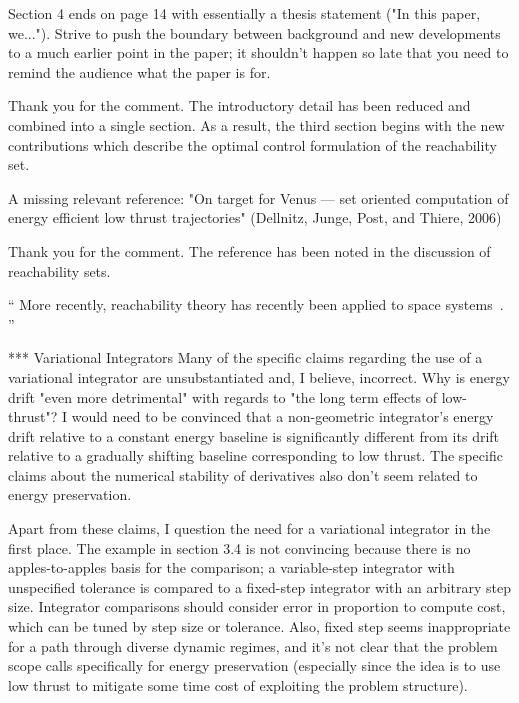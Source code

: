 \documentclass[11pt]{article}
\newenvironment{correction}{\begin{list}{}{\setlength{\leftmargin}{1cm}\setlength{\rightmargin}{1cm}}\vspace{\parsep}\item[]``}{''\end{list}}
\begin{document}
\begin{enumerate}
\item
    \begin{itshape}
Section 4 ends on page 14 with essentially a thesis statement ("In this paper, we...").  Strive to push the boundary between background and new developments to a much earlier point in the paper; it shouldn't happen so late that you need to remind the audience what the paper is for.
\end{itshape}

Thank you for the comment. 
The introductory detail has been reduced and combined into a single section. 
As a result, the third section begins with the new contributions which describe the optimal control formulation of the reachability set.

\item 
    \begin{itshape}
A missing relevant reference: "On target for Venus — set oriented computation of energy efficient low thrust trajectories" (Dellnitz, Junge, Post, and Thiere, 2006)
\end{itshape}

Thank you for the comment.
The reference has been noted in the discussion of reachability sets.
\begin{correction}
More recently, reachability theory has recently been applied to space systems~\cite{holzinger2009,komendera2012a,dellnitz2006}.
\end{correction}

\item
    {\color{red}
    \begin{itshape}
*** Variational Integrators
Many of the specific claims regarding the use of a variational integrator are unsubstantiated and, I believe, incorrect. Why is energy drift "even more detrimental" with regards to "the long term effects of low-thrust"?  I would need to be convinced that a non-geometric integrator's energy drift relative to a constant energy baseline is significantly different from its drift relative to a gradually shifting baseline corresponding to low thrust. The specific claims about the numerical stability of derivatives also don't seem related to energy preservation.  

\end{itshape}
}

\item
    {\color{red}
    \begin{itshape}
Apart from these claims, I question the need for a variational integrator in the first place. The example in section 3.4 is not convincing because there is no apples-to-apples basis for the comparison; a variable-step integrator with unspecified tolerance is compared to a fixed-step integrator with an arbitrary step size.  Integrator comparisons should consider error in proportion to compute cost, which can be tuned by step size or tolerance.  Also, fixed step seems inappropriate for a path through diverse dynamic regimes, and it's not clear that the problem scope calls specifically for energy preservation (especially since the idea is to use low thrust to mitigate some time cost of exploiting the problem structure).  
\end{itshape}
}


\end{enumerate}
\end{document}
